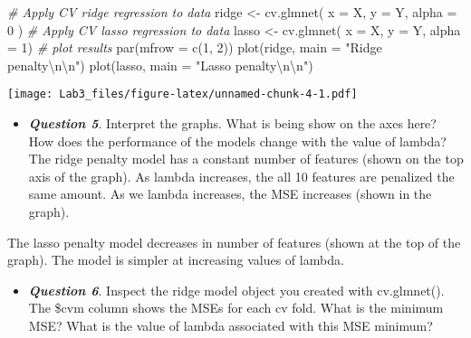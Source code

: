 \documentclass[
]{article}
\newenvironment{Shaded}{\begin{snugshade}}{\end{snugshade}}
\newcommand{\AttributeTok}[1]{\textcolor[rgb]{0.77,0.63,0.00}{#1}}
\newcommand{\CommentTok}[1]{\textcolor[rgb]{0.56,0.35,0.01}{\textit{#1}}}
\newcommand{\DecValTok}[1]{\textcolor[rgb]{0.00,0.00,0.81}{#1}}
\newcommand{\FunctionTok}[1]{\textcolor[rgb]{0.00,0.00,0.00}{#1}}
\newcommand{\NormalTok}[1]{#1}
\newcommand{\OtherTok}[1]{\textcolor[rgb]{0.56,0.35,0.01}{#1}}
\newcommand{\SpecialCharTok}[1]{\textcolor[rgb]{0.00,0.00,0.00}{#1}}
\newcommand{\StringTok}[1]{\textcolor[rgb]{0.31,0.60,0.02}{#1}}
\providecommand{\tightlist}{%
  \setlength{\itemsep}{0pt}\setlength{\parskip}{0pt}}
\begin{document}
\begin{Shaded}
\begin{Highlighting}[]
\CommentTok{\# Apply CV ridge regression to data}
\NormalTok{ridge }\OtherTok{\textless{}{-}} \FunctionTok{cv.glmnet}\NormalTok{(}
  \AttributeTok{x =}\NormalTok{ X,}
  \AttributeTok{y =}\NormalTok{ Y,}
  \AttributeTok{alpha =} \DecValTok{0}
\NormalTok{)}
\CommentTok{\# Apply CV lasso regression to data}
\NormalTok{lasso }\OtherTok{\textless{}{-}} \FunctionTok{cv.glmnet}\NormalTok{(}
  \AttributeTok{x =}\NormalTok{ X,}
  \AttributeTok{y =}\NormalTok{ Y,}
  \AttributeTok{alpha =} \DecValTok{1}\NormalTok{)}
\CommentTok{\# plot results}
\FunctionTok{par}\NormalTok{(}\AttributeTok{mfrow =} \FunctionTok{c}\NormalTok{(}\DecValTok{1}\NormalTok{, }\DecValTok{2}\NormalTok{))}
\FunctionTok{plot}\NormalTok{(ridge, }\AttributeTok{main =} \StringTok{"Ridge penalty}\SpecialCharTok{\textbackslash{}n\textbackslash{}n}\StringTok{"}\NormalTok{)}
\FunctionTok{plot}\NormalTok{(lasso, }\AttributeTok{main =} \StringTok{"Lasso penalty}\SpecialCharTok{\textbackslash{}n\textbackslash{}n}\StringTok{"}\NormalTok{)}
\end{Highlighting}
\end{Shaded}

\texttt{[image: Lab3\_files/figure-latex/unnamed-chunk-4-1.pdf]}

\begin{itemize}
\tightlist
\item
  \textbf{\emph{Question 5}}. Interpret the graphs. What is being show
  on the axes here? How does the performance of the models change with
  the value of lambda? The ridge penalty model has a constant number of
  features (shown on the top axis of the graph). As lambda increases,
  the all 10 features are penalized the same amount. As we lambda
  increases, the MSE increases (shown in the graph).
\end{itemize}

The lasso penalty model decreases in number of features (shown at the
top of the graph). The model is simpler at increasing values of lambda.

\begin{itemize}
\tightlist
\item
  \textbf{\emph{Question 6}}. Inspect the ridge model object you created
  with cv.glmnet(). The \$cvm column shows the MSEs for each cv fold.
  What is the minimum MSE? What is the value of lambda associated with
  this MSE minimum?
\end{itemize}
\end{document}
